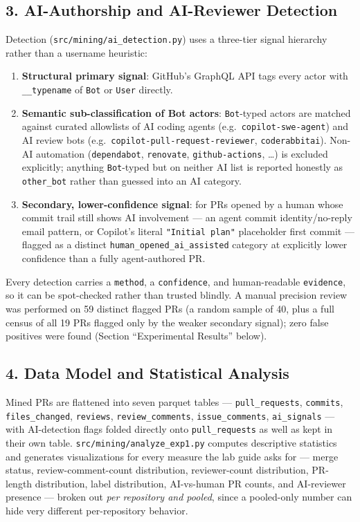 \documentclass{experimentreport}
\begin{document}
{\subsection*{3. AI-Authorship and AI-Reviewer Detection}

Detection (\texttt{src/mining/ai\_detection.py}) uses a three-tier signal hierarchy rather than a
username heuristic:

\begin{enumerate}
\item \textbf{Structural primary signal}: GitHub's GraphQL API tags every actor with
\texttt{\_\_typename} of \texttt{Bot} or \texttt{User} directly.
\item \textbf{Semantic sub-classification of Bot actors}: \texttt{Bot}-typed actors are matched
against curated allowlists of AI coding agents (e.g.\ \texttt{copilot-swe-agent}) and AI review
bots (e.g.\ \texttt{copilot-pull-request-reviewer}, \texttt{coderabbitai}). Non-AI automation
(\texttt{dependabot}, \texttt{renovate}, \texttt{github-actions}, \ldots) is excluded explicitly;
anything \texttt{Bot}-typed but on neither AI list is reported honestly as \texttt{other\_bot}
rather than guessed into an AI category.
\item \textbf{Secondary, lower-confidence signal}: for PRs opened by a human whose commit trail
still shows AI involvement --- an agent commit identity/no-reply email pattern, or Copilot's
literal \texttt{"Initial plan"} placeholder first commit --- flagged as a distinct
\texttt{human\_opened\_ai\_assisted} category at explicitly lower confidence than a fully
agent-authored PR.
\end{enumerate}

Every detection carries a \texttt{method}, a \texttt{confidence}, and human-readable
\texttt{evidence}, so it can be spot-checked rather than trusted blindly. A manual precision
review was performed on 59 distinct flagged PRs (a random sample of 40, plus a full census of all
19 PRs flagged only by the weaker secondary signal); zero false positives were found (Section
``Experimental Results'' below).

\subsection*{4. Data Model and Statistical Analysis}

Mined PRs are flattened into seven parquet tables --- \texttt{pull\_requests}, \texttt{commits},
\texttt{files\_changed}, \texttt{reviews}, \texttt{review\_comments}, \texttt{issue\_comments},
\texttt{ai\_signals} --- with AI-detection flags folded directly onto \texttt{pull\_requests} as
well as kept in their own table. \texttt{src/mining/analyze\_exp1.py} computes descriptive
statistics and generates visualizations for every measure the lab guide asks for --- merge status,
review-comment-count distribution, reviewer-count distribution, PR-length distribution, label
distribution, AI-vs-human PR counts, and AI-reviewer presence --- broken out \emph{per repository
and pooled}, since a pooled-only number can hide very different per-repository behavior.

}
\end{document}
